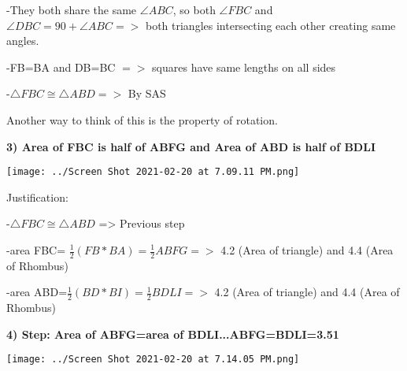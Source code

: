 \documentclass{article}
\begin{document}
\vspace{2mm}

-They both share the same $\angle ABC$, so both $\angle FBC$ and $\angle DBC=90+\angle ABC =>$ both triangles intersecting each other creating same angles.

\vspace{2mm}

-FB=BA and DB=BC $=>$ squares have same lengths on all sides

\vspace{2mm}

-$\triangle FBC \cong \triangle ABD =>$ By SAS 

\vspace{2mm}

Another way to think of this is the property of rotation. 

\vspace{4mm}

\textbf{3) Area of FBC is half of ABFG and Area of ABD is half of BDLI}

\vspace{2mm}

\texttt{[image: ../Screen Shot 2021-02-20 at 7.09.11 PM.png]}

\vspace{2mm}

Justification: 

\vspace{2mm}

-$\triangle FBC \cong \triangle ABD$ => Previous step

\vspace{2mm}

-area FBC= $\frac{1}{2}(FB * BA)=\frac{1}{2} ABFG = > $ 4.2 (Area of triangle) and 4.4 (Area of Rhombus)

\vspace{2mm}

-area ABD=$\frac{1}{2}(BD * BI)=\frac{1}{2} BDLI = >$ 4.2 (Area of triangle) and 4.4 (Area of Rhombus)

\vspace{4mm}

\newpage
\textbf{4) Step: Area of ABFG=area of BDLI...ABFG=BDLI=3.51}

\vspace{2mm}

\texttt{[image: ../Screen Shot 2021-02-20 at 7.14.05 PM.png]}

\vspace{2mm}
\end{document}
